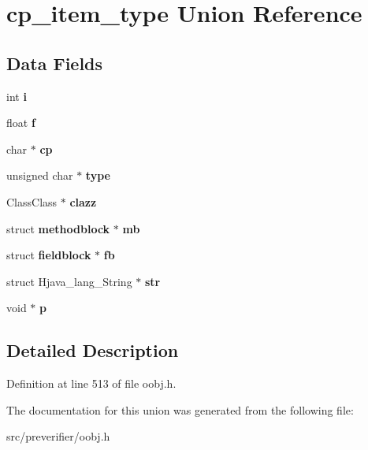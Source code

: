 \section{cp\_\-item\_\-type Union Reference}
\label{unioncp__item__type}
\subsection*{Data Fields}
\begin{DoxyCompactItemize}
\item 
int {\bfseries i}\label{unioncp__item__type_a84f2f9550e8801db30e1bd04e3ce658d}

\item 
float {\bfseries f}\label{unioncp__item__type_af28277770faf9dab6a88997c5d964346}

\item 
char $\ast$ {\bfseries cp}\label{unioncp__item__type_a3e05b8b73fca2ae579f5178847fbb528}

\item 
unsigned char $\ast$ {\bfseries type}\label{unioncp__item__type_af992583a9cabcada748dea9ebce2fedd}

\item 
ClassClass $\ast$ {\bfseries clazz}\label{unioncp__item__type_a763a7b98762fabb1595ad4b571de6a17}

\item 
struct {\bf methodblock} $\ast$ {\bfseries mb}\label{unioncp__item__type_a01c14490948b2fe287363206ae1c6f10}

\item 
struct {\bf fieldblock} $\ast$ {\bfseries fb}\label{unioncp__item__type_a6665d6224c2a8dcb085747a620bb3503}

\item 
struct Hjava\_\-lang\_\-String $\ast$ {\bfseries str}\label{unioncp__item__type_a42918cffde9e28c60edc041e1a740dd8}

\item 
void $\ast$ {\bfseries p}\label{unioncp__item__type_a04e74ba677ce7b959786195468e602ad}

\end{DoxyCompactItemize}


\subsection{Detailed Description}


Definition at line 513 of file oobj.h.



The documentation for this union was generated from the following file:\begin{DoxyCompactItemize}
\item 
src/preverifier/oobj.h\end{DoxyCompactItemize}
